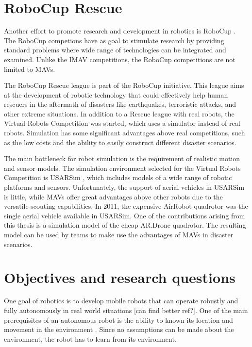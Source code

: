 	\section{RoboCup Rescue}
Another effort to promote research and development in robotics is RoboCup \cite{kitano1997robocup}.
The RoboCup competions have as goal to stimulate research by providing standard problems where wide range of technologies can be integrated and examined.
Unlike the IMAV competitions, the RoboCup competitions are not limited to MAVs.

The RoboCup Rescue league \cite{kitano1999robocup} is part of the RoboCup initiative.
This league aims at the development of robotic technology that could effectively help human rescuers in the aftermath of disasters like earthquakes, terroristic attacks, and other extreme situations.
In addition to a Rescue league with real robots, the Virtual Robots Competition was started, which uses a simulator instead of real robots.
Simulation has some significant advantages above real competitions, such as the low costs and the ability to easily construct different disaster scenarios.

The main bottleneck for robot simulation is the requirement of realistic motion and sensor models.
The simulation environment selected for the Virtual Robots Competition is USARSim \cite{Balakirsky2009iros,carpin2007usarsim}, which includes models of a wide range of robotic platforms and sensors.
Unfortunately, the support of aerial vehicles in USARSim is little, while MAVs offer great advantages above other robots due to the versatile scouting capabilities.
In 2011, the expensive AirRobot quadrotor was the single aerial vehicle available in USARSim.
One of the contributions arising from this thesis is a simulation model of the cheap AR.Drone quadrotor.
The resulting model can be used by teams to make use the advantages of MAVs in disaster scenarios.


	\section{Objectives and research questions}
One goal of robotics is to develop mobile robots that can operate robustly and fully autonomously in real world situations \cite{murphy2000introduction} [can find better ref?].
One of the main prerequisites of an autonomous robot is the ability to known its location and movement in the environment \cite{talluri1992position}.
Since no assumptions can be made about the environment, the robot has to learn from its environment.

